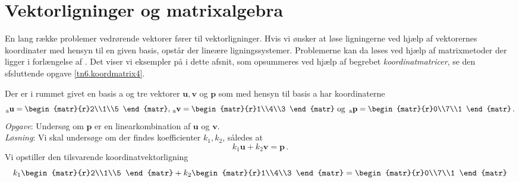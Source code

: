 \section{Vektorligninger og matrixalgebra}
En lang række problemer vedrørende vektorer fører til vektorligninger. Hvis vi ønsker at løse ligningerne ved hjælp af vektorernes koordinater med hensyn til en given basis, opstår der lineære ligningssystemer. Problemerne kan da løses ved hjælp af matrixmetoder der ligger i forlængelse af . Det viser vi eksempler på i dette afsnit, som opsummeres ved hjælp af begrebet \textit{koordinatmatricer}, se den sfsluttende opgave \ref{tn6.koordmatrix4}. 
\\
\begin{example}\label{tn6.koordmatrix1}
Der er i rummet givet en basis a og tre vektorer $\mathbf u,\mathbf v$ og $\mathbf p$ som med hensyn til basis a har koordinaterne
$$
{_\mathrm{a}\mathbf{u}}=\begin{matr}{r}2\\1\\5 \end{matr},\,
{_\mathrm{a}\mathbf{v}}=\begin{matr}{r}1\\4\\3 \end{matr}\,\,\mathrm{og}\,\,\,
{_\mathrm{a}\mathbf{p}}=\begin{matr}{r}0\\7\\1 \end{matr}\,.
$$
\textit{Opgave}: Undersøg om $\mathbf p$ er en linearkombination af $\mathbf u$ og $\mathbf v$.
\smallskip\\
\textit{Løsning}: Vi skal undersøge om der findes koefficienter $k_1,k_2$, således at
$$
k_1\mathbf u+k_2\mathbf v=\mathbf p\,.
$$ 
Vi opstiller den tilsvarende koordinatvektorligning
$$
k_1\begin{matr}{r}2\\1\\5 \end{matr}+k_2\begin{matr}{r}1\\4\\3 \end{matr}=\begin{matr}{r}0\\7\\1 \end{matr}
$$
\end{example}

